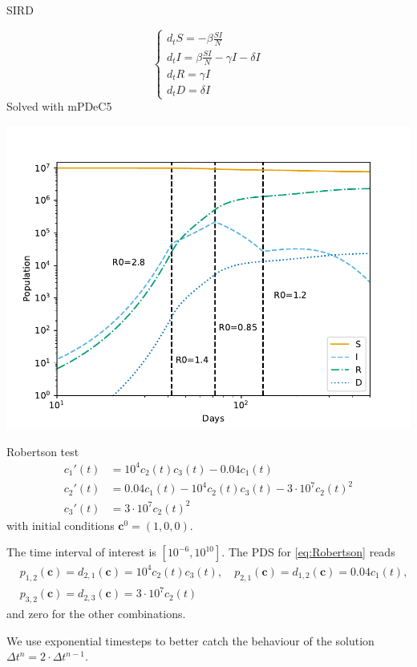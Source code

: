 \documentclass[aspectratio=169]{beamer}
\newcommand{\1}{\begin{pmatrix}
                 1\\
                 1
                \end{pmatrix}}
\def\bc{\mathbf{c}}
\begin{document}
\begin{frame}{SIRD}
	\begin{minipage}{0.35\textwidth}
		\begin{equation*}
		\begin{cases}
		d_tS = - \beta \frac{SI}{N}\\
		d_t I = \beta \frac{SI}{N} -\gamma I- \delta I \\
		d_t R = \gamma I\\
		d_t D = \delta I
		\end{cases}
		\end{equation*}
		Solved with mPDeC5
	\end{minipage} \hfill
	\begin{minipage}{0.63\textwidth}
	\includegraphics[height=0.8\textheight]{images/SIRsimul.pdf}
\end{minipage}
	
\end{frame}


\begin{frame}{Robertson test}
\begin{equation}\label{eq:Robertson}
 \begin{aligned}
  c_1'(t)&=10^4c_2(t)c_3(t)-0.04c_1(t)\\
  c_2'(t)&= 0.04c_1(t)-10^4c_2(t)c_3(t)-3\cdot 10^7c_2(t)^2\\
  c_3'(t)&=3\cdot 10^7c_2(t)^2
 \end{aligned}
\end{equation}
with initial conditions
$\bc^0=(1,0,0)$.

The time interval of interest is $[10^{-6}, 10^{10}]$.
The PDS for \eqref{eq:Robertson} reads
\begin{equation*}
\begin{split}
 & p_{1,2}(\bc)=d_{2,1}(\bc)=10^4c_2(t)c_3(t), \quad  
 p_{2,1}(\bc)=d_{1,2}(\bc)=0.04c_1(t),\\ 
 & p_{3,2}(\bc)=d_{2,3}(\bc)=3\cdot 10^7c_2(t)
\end{split}
\end{equation*}
and zero for the other combinations.

We use exponential timesteps to better catch the behaviour of the solution $\Delta t^n = 2\cdot \Delta t^{n-1}$.
\end{frame}
\end{document}
